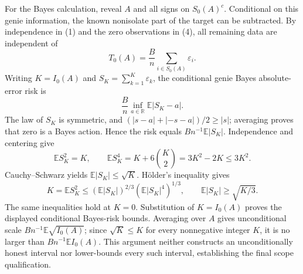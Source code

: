 For the Bayes calculation, reveal \(A\) and all signs on \(S_0(A)^c\).  Conditional on this genie information, the known nonisolate part of the target can be subtracted.  By independence in (1) and the zero observations in (4), all remaining data are independent of
\[
 T_0(A)=\frac Bn\sum_{i\in S_0(A)}\varepsilon_i.
\tag{6}
\]
Writing \(K=I_0(A)\) and \(S_K=\sum_{k=1}^K\varepsilon_k\), the conditional genie Bayes absolute-error risk is
\[
 \frac Bn\inf_{a\in\mathbb R}\mathbb E|S_K-a|.
\]
The law of \(S_K\) is symmetric, and \((|s-a|+|-s-a|)/2\geq|s|\); averaging proves that zero is a Bayes action.  Hence the risk equals \(Bn^{-1}\mathbb E|S_K|\).  Independence and centering give
\[
 \mathbb ES_K^2=K,
 \qquad \mathbb ES_K^4=K+6{K\choose2}=3K^2-2K\leq3K^2.
\tag{7}
\]
Cauchy--Schwarz yields \(\mathbb E|S_K|\leq\sqrt K\).  H\"older's inequality gives
\[
 K=\mathbb ES_K^2
 \leq(\mathbb E|S_K|)^{2/3}(\mathbb E|S_K|^4)^{1/3},
 \qquad \mathbb E|S_K|\geq\sqrt{K/3}.
\tag{8}
\]
The same inequalities hold at \(K=0\).  Substitution of \(K=I_0(A)\) proves the displayed conditional Bayes-risk bounds.  Averaging over \(A\) gives unconditional scale \(Bn^{-1}\mathbb E\sqrt{I_0(A)}\); since \(\sqrt K\leq K\) for every nonnegative integer \(K\), it is no larger than \(Bn^{-1}\mathbb EI_0(A)\).  This argument neither constructs an unconditionally honest interval nor lower-bounds every such interval, establishing the final scope qualification.